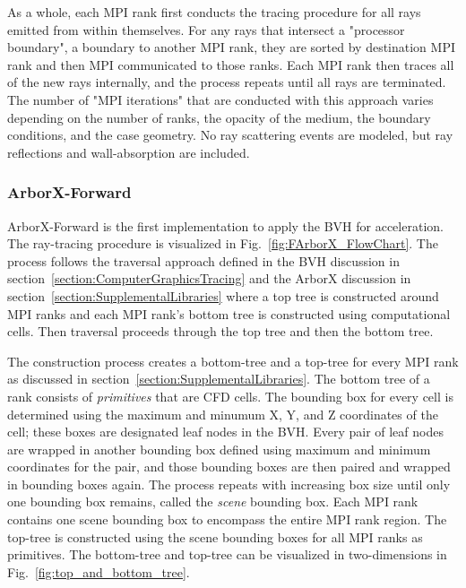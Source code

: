 As a whole, each MPI rank first conducts the tracing procedure for all rays emitted from within themselves. For any rays that intersect a "processor boundary", a boundary to another MPI rank, they are sorted by destination MPI rank and then MPI communicated to those ranks. Each MPI rank then traces all of the new rays internally, and the process repeats until all rays are terminated. The number of "MPI iterations" that are conducted with this approach varies depending on the number of ranks, the opacity of the medium, the boundary conditions, and the case geometry. No ray scattering events are modeled, but ray reflections and wall-absorption are included.


\subsubsection{ArborX-Forward}
ArborX-Forward is the first implementation to apply the BVH for acceleration. The ray-tracing procedure is visualized in Fig.~\ref{fig:FArborX_FlowChart}.
The process follows the traversal approach defined in the BVH discussion in section~\ref{section:ComputerGraphicsTracing} and the ArborX discussion in section~\ref{section:SupplementalLibraries} where a top tree is constructed around MPI ranks and each MPI rank's bottom tree is constructed using computational cells. Then traversal proceeds through the top tree and then the bottom tree.

The construction process creates a bottom-tree and a top-tree for every MPI rank as discussed in section~\ref{section:SupplementalLibraries}. The bottom tree of a rank consists of \textit{primitives} that are CFD cells. The bounding box for every cell is determined using the maximum and minumum X, Y, and Z coordinates of the cell; these boxes are designated leaf nodes in the BVH. Every pair of leaf nodes are wrapped in another bounding box defined using maximum and minimum coordinates for the pair, and those bounding boxes are then paired and wrapped in bounding boxes again. The process repeats with increasing box size until only one bounding box remains, called the \textit{scene} bounding box. Each MPI rank contains one scene bounding box to encompass the entire MPI rank region. The top-tree is constructed using the scene bounding boxes for all MPI ranks as primitives. The bottom-tree and top-tree can be visualized in two-dimensions in Fig.~\ref{fig:top_and_bottom_tree}. 

